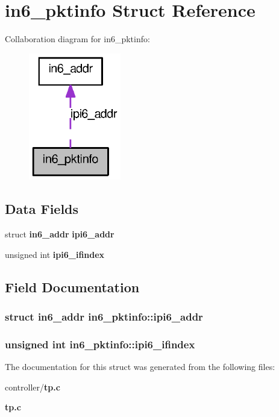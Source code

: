 \section{in6\_\-pktinfo Struct Reference}
\label{structin6__pktinfo}


Collaboration diagram for in6\_\-pktinfo:
\nopagebreak
\begin{figure}[H]
\begin{center}
\leavevmode
\includegraphics[width=114pt]{structin6__pktinfo__coll__graph}
\end{center}
\end{figure}
\subsection*{Data Fields}
\begin{DoxyCompactItemize}
\item 
struct {\bf in6\_\-addr} {\bf ipi6\_\-addr}
\item 
unsigned int {\bf ipi6\_\-ifindex}
\end{DoxyCompactItemize}


\subsection{Field Documentation}
\subsubsection[{ipi6\_\-addr}]{\setlength{\rightskip}{0pt plus 5cm}struct {\bf in6\_\-addr} {\bf in6\_\-pktinfo::ipi6\_\-addr}}\label{structin6__pktinfo_a87b026872bd4ab42bc948a1951f0922b}
\subsubsection[{ipi6\_\-ifindex}]{\setlength{\rightskip}{0pt plus 5cm}unsigned int {\bf in6\_\-pktinfo::ipi6\_\-ifindex}}\label{structin6__pktinfo_a9ce9353893fc69ca3c177826305e28e7}


The documentation for this struct was generated from the following files:\begin{DoxyCompactItemize}
\item 
controller/{\bf tp.c}\item 
{\bf tp.c}\end{DoxyCompactItemize}
